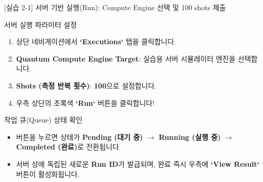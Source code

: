 \documentclass[aspectratio=169, 10pt]{beamer}
\begin{document}
\begin{frame}{[실습 2-1] 서버 기반 실행(Run): Compute Engine 선택 및 100 shots 제출}
    \begin{qcblock}{서버 실행 파라미터 설정}
        \begin{enumerate}
            \item 상단 네비게이션에서 \textbf{`Executions`} 탭을 클릭합니다.
            \pause
            \item \textbf{Quantum Compute Engine Target}: 실습용 서버 시뮬레이터 엔진을 선택합니다.
            \pause
            \item \textbf{Shots (측정 반복 횟수)}: \textbf{100}으로 설정합니다.
            \pause
            \item 우측 상단의 초록색 \textbf{`Run`} 버튼을 클릭합니다!
        \end{enumerate}
    \end{qcblock}
    \vspace{0.2cm}
    \begin{qctip}{작업 큐(Queue) 상태 확인}
        \begin{itemize}
            \item 버튼을 누르면 상태가 \textbf{Pending (대기 중)} $\to$ \textbf{Running (실행 중)} $\to$ \textbf{Completed (완료)}로 전환됩니다.
            \pause
            \item 서버 상에 독립된 새로운 \textbf{Run ID}가 발급되며, 완료 즉시 우측에 \textbf{`View Result`} 버튼이 활성화됩니다.
        \end{itemize}
    \end{qctip}
\end{frame}
\end{document}
